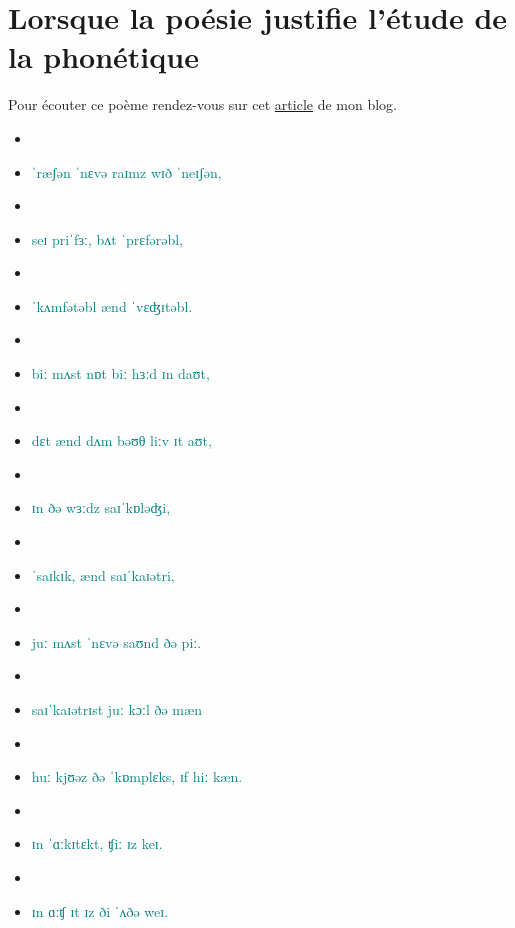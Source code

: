\chapter{Lorsque la poésie justifie l'étude de la phonétique}

Pour écouter ce poème rendez-vous sur cet
\href{http://doyouspeakenglish.fr/un-poeme-qui-justifie-letude-de-la-phonetique/}{article}
de mon blog.

\begin{itemize}
\item {}
\item \textcolor{teal}{ˈræʃən ˈnɛvə raɪmz wɪð ˈneɪʃən,}
\item {}
\item \textcolor{teal}{seɪ priˈfɜː, bʌt ˈprɛfərəbl,}
\item {}
\item \textcolor{teal}{ˈkʌmfətəbl ænd ˈvɛʤɪtəbl.}
\item {}
\item \textcolor{teal}{biː mʌst nɒt biː hɜːd ɪn daʊt,}
\item {}
\item \textcolor{teal}{dɛt ænd dʌm bəʊθ liːv ɪt aʊt,}
\item {}
\item \textcolor{teal}{ɪn ðə wɜːdz saɪˈkɒləʤi,}
\item {}
\item \textcolor{teal}{ˈsaɪkɪk, ænd saɪˈkaɪətri,}
\item {}
\item \textcolor{teal}{juː mʌst ˈnɛvə saʊnd ðə piː.}
\item {}
\item \textcolor{teal}{saɪˈkaɪətrɪst juː kɔːl ðə mæn}
\item {}
\item \textcolor{teal}{huː kjʊəz ðə ˈkɒmplɛks, ɪf hiː kæn.}
\item {}
\item \textcolor{teal}{ɪn ˈɑːkɪtɛkt, ʧiː ɪz keɪ.}
\item {}
\item \textcolor{teal}{ɪn ɑːʧ ɪt ɪz ði ˈʌðə weɪ.}

\end{itemize}
